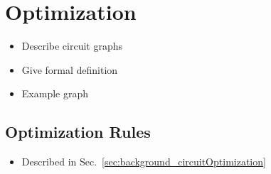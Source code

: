 \section{Optimization}
\begin{itemize}
    \item Describe circuit graphs
    \item Give formal definition
    \item Example graph
\end{itemize}

\subsection{Optimization Rules}
\begin{itemize}
    \item Described in Sec.~\ref{sec:background_circuitOptimization}
\end{itemize}

